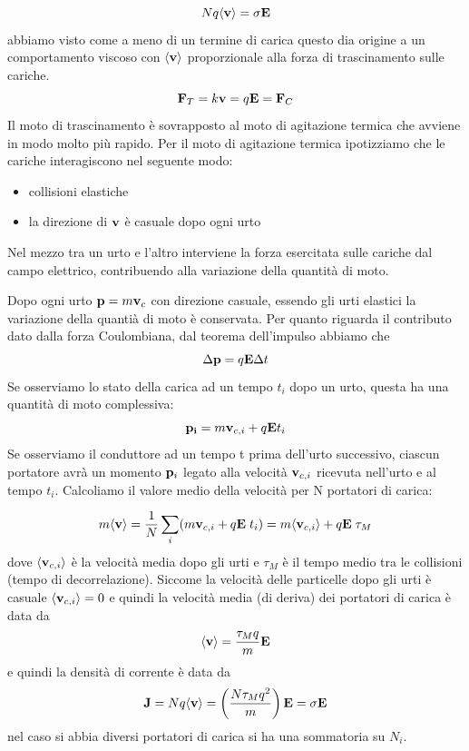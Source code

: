 \begin{equation*}
	Nq \langle \bold{v} \rangle = \sigma \bold{E}
\end{equation*}
abbiamo visto come a meno di un termine di carica questo dia origine a un comportamento viscoso con $\langle \bold{v} \rangle$ proporzionale alla forza di trascinamento sulle cariche.
\begin{equation*}
	\bold{F}_{T} = k \bold{v} = q \bold{E} = \bold{F}_{C}
\end{equation*}
Il moto di trascinamento \`e sovrapposto al moto di agitazione termica che avviene in modo molto pi\`u rapido. Per il moto di agitazione termica ipotizziamo che le cariche interagiscono nel seguente modo:
\begin{itemize}
	\item collisioni elastiche
	\item la direzione di $\bold{v}$ \`e casuale dopo ogni urto
\end{itemize}
Nel mezzo tra un urto e l'altro interviene la forza esercitata sulle cariche dal campo elettrico, contribuendo alla variazione della quantit\`a di moto.

Dopo ogni urto $\bold{p} = m \bold{v}_{c}$ con  direzione casuale, essendo gli urti elastici la variazione della quanti\`a di moto \`e conservata. Per quanto riguarda il contributo dato dalla forza Coulombiana, dal teorema dell'impulso abbiamo che 
\begin{equation*}
	\Delta \bold{p} = q\bold{E} \Delta t
\end{equation*}
Se osserviamo lo stato della carica ad un tempo $t_i$ dopo un urto, questa ha una quantit\`a di moto complessiva:
\begin{equation*}
	\bold{p_i} = m\bold{v}_{c,i} + q\bold{E}t_i
\end{equation*}
Se osserviamo il conduttore ad un tempo t prima dell'urto successivo, ciascun portatore avr\`a un momento $\bold{p}_{i}$ legato alla velocit\`a $\bold{v}_{c,i}$ ricevuta nell'urto e al tempo $t_i$. Calcoliamo il valore medio della velocit\`a per N portatori di carica:

\begin{equation*}
	m \langle \bold{v} \rangle = \frac{1}{N} \sum_{i}(m \bold{v}_{c,i} + q \bold{E} \;t_i) = m \langle \bold{v}_{c,i} \rangle  + q \bold{E} \;\tau_{M}
\end{equation*}
dove $\langle \bold{v}_{c,i} \rangle$ \`e la velocit\`a media dopo gli urti e $\tau_{M}$ \`e il tempo medio tra le collisioni (tempo di decorrelazione). Siccome la velocit\`a delle particelle dopo gli urti \`e casuale $\langle \bold{v}_{c,i} \rangle = 0$ e quindi la velocit\`a media (di deriva) dei portatori di carica \`e data da
\begin{equation*}
	\langle \bold{v} \rangle = \frac{\tau_{M} q}{m} \bold{E}
\end{equation*}
e quindi la densit\`a di corrente \`e data da 
\begin{equation*}
	\bold{J} = Nq \langle \bold{v} \rangle = \left(\frac{N \tau_{M} q^2}{m}\right)\bold{E} = \sigma \bold{E}
\end{equation*}
nel caso si abbia diversi portatori di carica si ha una sommatoria su $N_i$. 

